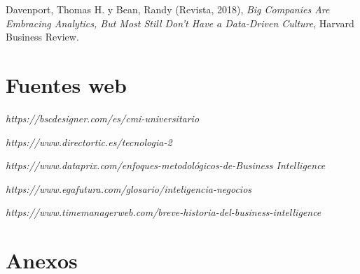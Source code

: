 \documentclass[12pt,jou]{apa7}
\begin{document}
\begin{thebibliography}{12}
 Davenport, Thomas H. y Bean, Randy  (Revista, 2018), \textit{ Big Companies Are Embracing Analytics, But Most Still Don’t Have a Data-Driven Culture}, Harvard Business Review.

\section{Fuentes web}
 \textit{https://bscdesigner.com/es/cmi-universitario}

 \textit{https://www.directortic.es/tecnologia-2}

 \textit{https://www.dataprix.com/enfoques-metodológicos-de-Business Intelligence}

 \textit{https://www.egafutura.com/glosario/inteligencia-negocios}

 \textit{https://www.timemanagerweb.com/breve-historia-del-business-intelligence}

\end{thebibliography}

\onecolumn
\section{Anexos}
\end{document}
